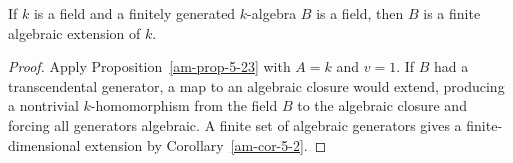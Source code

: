 \begin{corollary}
\label{am-cor-5-24}
\uses{}
If $k$ is a field and a finitely generated $k$-algebra $B$ is a field, then $B$
is a finite algebraic extension of $k$.
\end{corollary}
\begin{proof}
Apply Proposition~\ref{am-prop-5-23} with $A=k$ and $v=1$.  If $B$ had a
transcendental generator, a map to an algebraic closure would extend, producing
a nontrivial $k$-homomorphism from the field $B$ to the algebraic closure and
forcing all generators algebraic.  A finite set of algebraic generators gives a
finite-dimensional extension by Corollary~\ref{am-cor-5-2}.
\end{proof}
